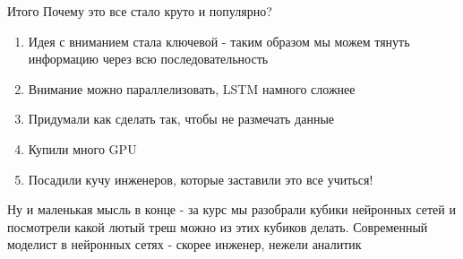 \documentclass[notes,12pt, aspectratio=169]{beamer}
\begin{document}
\begin{frame}{Итого}
Почему это все стало круто и популярно?
\begin{enumerate}
	\item Идея с вниманием стала ключевой - таким образом мы можем тянуть информацию через всю последовательность
	\item Внимание можно параллелизовать, LSTM намного сложнее
	\item Придумали как сделать так, чтобы не размечать данные
	\item Купили много GPU
	\item  Посадили кучу инженеров, которые заставили это все учиться!
\end{enumerate}
Ну и маленькая мысль в конце - за курс мы разобрали кубики нейронных сетей и посмотрели какой лютый треш можно из этих кубиков делать. Современный моделист в нейронных сетях - скорее инженер, нежели аналитик
\end{frame}
\end{document}
